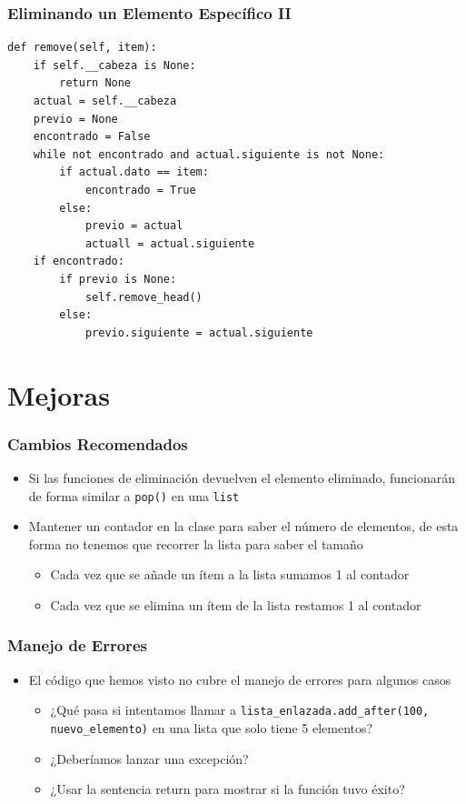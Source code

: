 \documentclass[11pt]{beamer}
\begin{document}
    \begin{frame}[fragile]\frametitle{Eliminando un Elemento Específico II}
\begin{lstlisting}[basicstyle=\footnotesize]
def remove(self, item):
	if self.__cabeza is None:
		return None
	actual = self.__cabeza
	previo = None
	encontrado = False
	while not encontrado and actual.siguiente is not None:
		if actual.dato == item:
			encontrado = True
		else:
			previo = actual
			actuall = actual.siguiente
	if encontrado:
		if previo is None:
			self.remove_head()
		else:
			previo.siguiente = actual.siguiente
\end{lstlisting}
    \end{frame}

\section{Mejoras}

	\begin{frame}
		\frametitle{Cambios Recomendados}
		\begin{itemize}
			\item Si las funciones de eliminación devuelven el elemento eliminado, funcionarán de forma similar a \texttt{pop()} en una \texttt{list} 
			\item Mantener un contador en la clase para saber el número de elementos, de esta forma no tenemos que recorrer la lista para saber el tamaño 
			\begin{itemize}
				\item Cada vez que se añade un ítem a la lista sumamos 1 al contador
				\item Cada vez que se elimina un ítem de la lista restamos 1 al contador
			\end{itemize}
		\end{itemize}
	\end{frame}

	\begin{frame}
		\frametitle{Manejo de Errores}
		\begin{itemize}
			\item El código que hemos visto no cubre el manejo de errores para algunos casos
			\begin{itemize}
				\item ¿Qué pasa si intentamos llamar a \lstinline|lista_enlazada.add_after(100, nuevo_elemento)| en una lista que solo tiene 5 elementos?
				\item ¿Deberíamos lanzar una excepción?
				\item ¿Usar la sentencia return para mostrar si la función tuvo éxito? 
			\end{itemize}
		\end{itemize}
	\end{frame}
\end{document}
